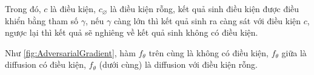 Trong đó, $c$ là điều kiện, $c_{\varnothing}$ là điều kiện rỗng,  kết quả sinh điều kiện được điều khiển bằng tham số $\gamma$, nếu $\gamma$ càng lớn thì kết quả sinh ra càng sát với điều kiện $c$, ngược lại thì kết quả sẽ nghiêng về kết quả sinh không có điều kiện.


Như \autoref{fig:AdversarialGradient}, hàm $f_{ \theta}$ trên cùng là không có điều kiện, $f_{ \theta}$ giữa là diffusion có điều kiện, $f_{ \theta}$ (dưới cùng) là diffusion với điều kiện rỗng.